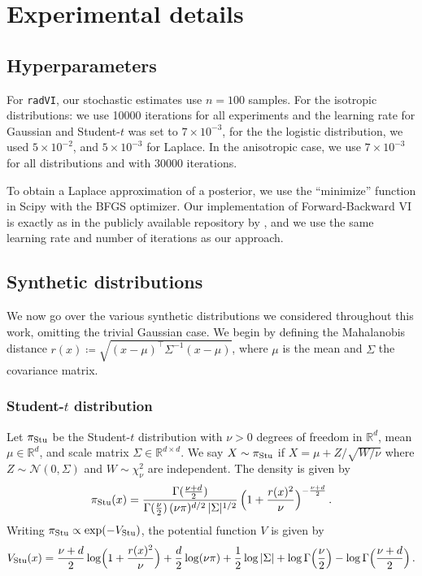 \documentclass[twoside]{article}
\newcommand{\1}{\mathds{1}}
\newcommand{\R}{\mathbb{R}}
\newcommand*{\defeq}{\coloneqq}
\theoremstyle{plain}
\theoremstyle{definition}
\theoremstyle{remark}
\begin{document}
\section{Experimental details} \label{app:experiments}
\subsection{Hyperparameters}
For \texttt{radVI}, our stochastic estimates use $n=100$ samples. For the isotropic distributions: we use 10000 iterations for all experiments and the learning rate for Gaussian and Student-$t$ was set to $7\times 10^{-3}$, for the the logistic distribution, we used $5\times 10^{-2}$, and $5\times 10^{-3}$ for Laplace. In the anisotropic case, we use $7 \times 10^{-3}$ for all distributions and with 30000 iterations.

To obtain a Laplace approximation of a posterior, we use the ``minimize'' function in Scipy \citep{virtanen2020scipy} with the BFGS optimizer. Our implementation of Forward-Backward VI is exactly as in the publicly available repository by \citet{Diao2023}, and we use the same learning rate and number of iterations as our approach.

\subsection{Synthetic distributions}\label{app:analytical_ot_map}
We now go over the various synthetic distributions we considered throughout this work, omitting the trivial Gaussian case. We begin by defining the Mahalanobis distance 
$r(x) \defeq \sqrt{(x-\mu)^\top \Sigma^{-1}(x-\mu)}$, where $\mu$ is the mean and $\Sigma$ the covariance matrix.

\subsubsection{Student-\texorpdfstring{$t$}{t} distribution}
Let $\pi_{\rm Stu}$ be the Student-$t$ distribution with $\nu > 0$ degrees of freedom in $\R^d$, mean $\mu \in \R^d$, and {scale matrix} $\Sigma \in \R^{d\times d}$. {We say $X\sim \pi_{\rm Stu}$ if $X =\mu + Z/\sqrt{W/\nu}$ where $Z \sim \mathcal{N}(0,\Sigma)$ and $W \sim \chi^2_\nu$ are
independent.}
The density is given by
\begin{equation*}
\pi_{\rm Stu}(x) =
\frac{\Gamma(\frac{\nu + d}{2})}
     {\Gamma(\frac{\nu}{2})\, (\nu \pi)^{d/2}\, |\Sigma|^{1/2}}\,
\Bigl(1 + \frac{r(x)^2}{\nu}\Bigr)^{-\frac{\nu + d}{2}}\,.
\end{equation*}
Writing $\pi_{\rm Stu} \propto\exp(-V_{\rm Stu})$, the potential function $V$ is given by
\begin{align*}
V_{\rm Stu}(x) = \frac{\nu + d}{2} \log\Bigl(1 + \frac{r(x)^2}{\nu}\Bigr)
+ \frac{d}{2}\log(\nu \pi) 
+ \frac{1}{2}\log|\Sigma| + \log\Gamma\Bigl(\frac{\nu}{2}\Bigr) 
- \log\Gamma\Bigl(\frac{\nu+d}{2}\Bigr)\,.
\end{align*}
\end{document}
